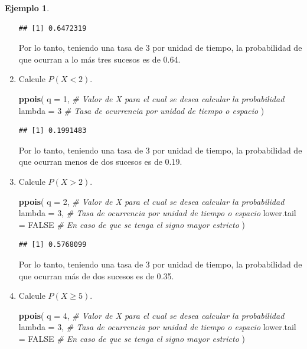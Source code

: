\documentclass[
  11pt,
]{book}
\newenvironment{Shaded}{\begin{snugshade}}{\end{snugshade}}
\newcommand{\AttributeTok}[1]{\textcolor[rgb]{0.13,0.29,0.53}{#1}}
\newcommand{\CommentTok}[1]{\textcolor[rgb]{0.56,0.35,0.01}{\textit{#1}}}
\newcommand{\ConstantTok}[1]{\textcolor[rgb]{0.56,0.35,0.01}{#1}}
\newcommand{\DecValTok}[1]{\textcolor[rgb]{0.00,0.00,0.81}{#1}}
\newcommand{\FunctionTok}[1]{\textcolor[rgb]{0.13,0.29,0.53}{\textbf{#1}}}
\newcommand{\NormalTok}[1]{#1}
\theoremstyle{definition}
\theoremstyle{definition}
\newtheorem{example}{Ejemplo}[chapter]
\theoremstyle{definition}
\theoremstyle{definition}
\theoremstyle{remark}
\begin{document}
\begin{example}
\begin{enumerate}
\begin{verbatim}
## [1] 0.6472319
\end{verbatim}

  Por lo tanto, teniendo una tasa de 3 por unidad de tiempo, la probabilidad de que ocurran a lo más tres sucesos es de 0.64.
\item
  Calcule \(P(X < 2)\).

\begin{Shaded}
\begin{Highlighting}[]
\FunctionTok{ppois}\NormalTok{(}
  \AttributeTok{q =} \DecValTok{1}\NormalTok{, }\CommentTok{\# Valor de X para el cual se desea calcular la probabilidad}
  \AttributeTok{lambda =} \DecValTok{3} \CommentTok{\# Tasa de ocurrencia por unidad de tiempo o espacio}
\NormalTok{  )}
\end{Highlighting}
\end{Shaded}

\begin{verbatim}
## [1] 0.1991483
\end{verbatim}

  Por lo tanto, teniendo una tasa de 3 por unidad de tiempo, la probabilidad de que ocurran menos de dos sucesos es de 0.19.
\item
  Calcule \(P(X > 2)\).

\begin{Shaded}
\begin{Highlighting}[]
\FunctionTok{ppois}\NormalTok{(}
  \AttributeTok{q =} \DecValTok{2}\NormalTok{, }\CommentTok{\# Valor de X para el cual se desea calcular la probabilidad}
  \AttributeTok{lambda =} \DecValTok{3}\NormalTok{, }\CommentTok{\# Tasa de ocurrencia por unidad de tiempo o espacio}
  \AttributeTok{lower.tail =} \ConstantTok{FALSE} \CommentTok{\# En caso de que se tenga el signo mayor estricto}
\NormalTok{  )}
\end{Highlighting}
\end{Shaded}

\begin{verbatim}
## [1] 0.5768099
\end{verbatim}

  Por lo tanto, teniendo una tasa de 3 por unidad de tiempo, la probabilidad de que ocurran más de dos sucesos es de 0.35.
\item
  Calcule \(P(X\geq 5)\).

\begin{Shaded}
\begin{Highlighting}[]
\FunctionTok{ppois}\NormalTok{(}
  \AttributeTok{q =} \DecValTok{4}\NormalTok{, }\CommentTok{\# Valor de X para el cual se desea calcular la probabilidad}
  \AttributeTok{lambda =} \DecValTok{3}\NormalTok{, }\CommentTok{\# Tasa de ocurrencia por unidad de tiempo o espacio}
  \AttributeTok{lower.tail =} \ConstantTok{FALSE} \CommentTok{\# En caso de que se tenga el signo mayor estricto}
\NormalTok{  )}
\end{Highlighting}
\end{Shaded}


\end{enumerate}
\end{example}
\end{document}
